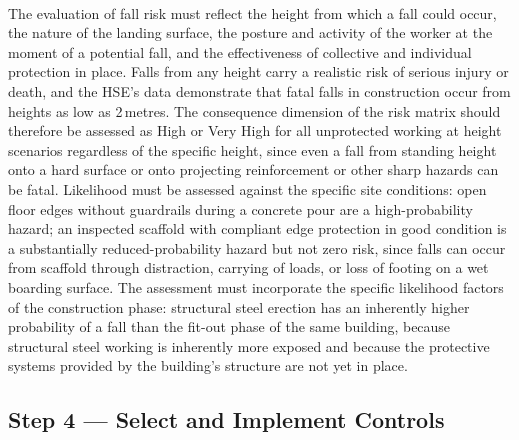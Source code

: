 \paragraph{}
The evaluation of fall risk must reflect the height from which a fall could occur, the nature of the landing surface, the posture and activity of the worker at the moment of a potential fall, and the effectiveness of collective and individual protection in place. Falls from any height carry a realistic risk of serious injury or death, and the HSE's data demonstrate that fatal falls in construction occur from heights as low as 2\,metres. The consequence dimension of the risk matrix should therefore be assessed as High or Very High for all unprotected working at height scenarios regardless of the specific height, since even a fall from standing height onto a hard surface or onto projecting reinforcement or other sharp hazards can be fatal. Likelihood must be assessed against the specific site conditions: open floor edges without guardrails during a concrete pour are a high-probability hazard; an inspected scaffold with compliant edge protection in good condition is a substantially reduced-probability hazard but not zero risk, since falls can occur from scaffold through distraction, carrying of loads, or loss of footing on a wet boarding surface. The assessment must incorporate the specific likelihood factors of the construction phase: structural steel erection has an inherently higher probability of a fall than the fit-out phase of the same building, because structural steel working is inherently more exposed and because the protective systems provided by the building's structure are not yet in place.

\subsection{Step 4 --- Select and Implement Controls}

